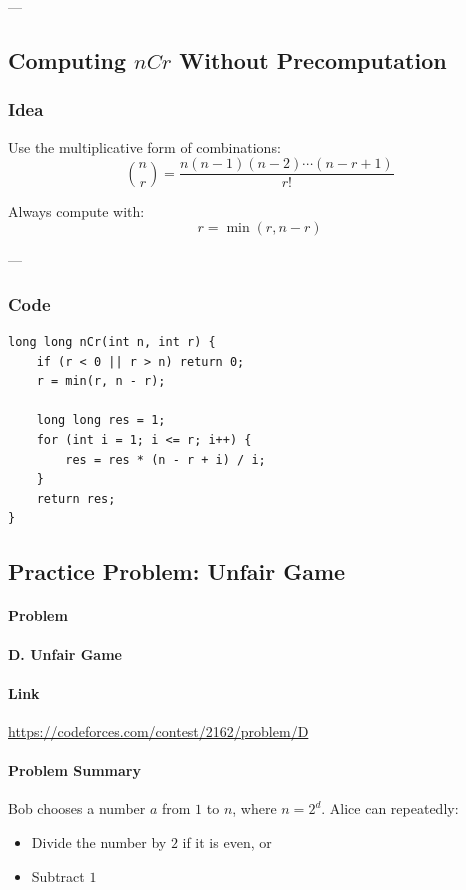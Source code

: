\documentclass[11pt]{article}
\begin{document}
---

\subsection{Computing $nCr$ Without Precomputation}

\subsubsection{Idea}
Use the multiplicative form of combinations:
\[
\binom{n}{r}
=
\frac{n(n-1)(n-2)\cdots(n-r+1)}{r!}
\]

Always compute with:
\[
r = \min(r, n-r)
\]

---

\subsubsection{Code}
\begin{lstlisting}
long long nCr(int n, int r) {
    if (r < 0 || r > n) return 0;
    r = min(r, n - r);

    long long res = 1;
    for (int i = 1; i <= r; i++) {
        res = res * (n - r + i) / i;
    }
    return res;
}
\end{lstlisting}

\subsection{Practice Problem: Unfair Game}

\paragraph{Problem}
\textbf{D. Unfair Game}

\paragraph{Link}
\url{https://codeforces.com/contest/2162/problem/D}

\paragraph{Problem Summary}

Bob chooses a number $a$ from $1$ to $n$, where $n = 2^d$.
Alice can repeatedly:
\begin{itemize}
    \item Divide the number by $2$ if it is even, or
    \item Subtract $1$
\end{itemize}
\end{document}
